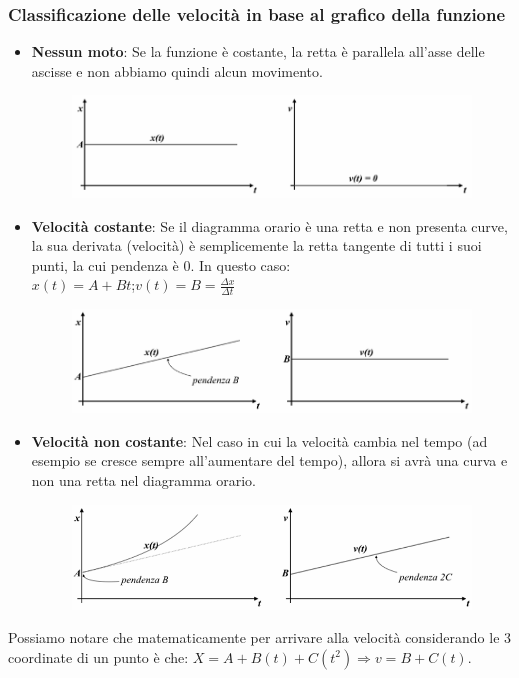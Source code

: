 \documentclass[a4paper,12pt]{report}
\begin{document}
	\subsubsection{Classificazione delle velocità in base al grafico della funzione}
	\begin{itemize}
		\item \textbf{Nessun moto}: Se la funzione è costante, la retta è parallela all'asse delle ascisse e non abbiamo quindi alcun movimento.
		\begin{figure}[H]
			\centering
			\includegraphics[width=300pt]{./immagini/cinematica/figcine2.png}
		\end{figure}
		\item \textbf{Velocità costante}: Se il diagramma orario è una retta e non presenta curve, la sua derivata (velocità) è semplicemente la retta tangente di tutti i suoi punti, la cui pendenza è 0. In questo caso:\\
		$x(t) = A + Bt$;\;\;\;$v(t) = B = \frac{\Delta x}{\Delta t}$
		\begin{figure}[H]
			\centering
			\includegraphics[width=300pt]{./immagini/cinematica/figcine3.png}
		\end{figure}
		\item \textbf{Velocità non costante}: Nel caso in cui la velocità cambia nel tempo (ad esempio se cresce sempre all'aumentare del tempo), allora si avrà una curva e non una retta nel diagramma orario.
		\begin{figure}[H]
			\centering
			\includegraphics[width=300pt]{./immagini/cinematica/figcine4.png}
		\end{figure}
	\end{itemize}
	Possiamo notare che matematicamente per arrivare alla velocità considerando le 3 coordinate di un punto è che: ${{X = A + B(t) + C(t^2)} \Rightarrow {v = B + C(t)}}$.
\end{document}

